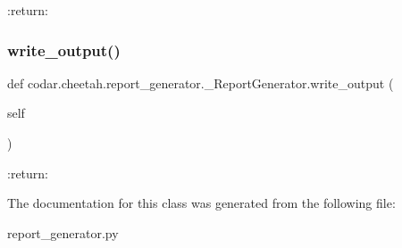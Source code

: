 \begin{DoxyVerb}:return:
\end{DoxyVerb}
 \mbox{\label{classcodar_1_1cheetah_1_1report__generator_1_1___report_generator_afa3df970816cabee4c9f898dd73db8ee}} 
\subsubsection{\texorpdfstring{write\+\_\+output()}{write\_output()}}
{\footnotesize\ttfamily def codar.\+cheetah.\+report\+\_\+generator.\+\_\+\+Report\+Generator.\+write\+\_\+output (\begin{DoxyParamCaption}\item[{}]{self }\end{DoxyParamCaption})}

\begin{DoxyVerb}:return:
\end{DoxyVerb}
 

The documentation for this class was generated from the following file\+:\begin{DoxyCompactItemize}
\item 
report\+\_\+generator.\+py\end{DoxyCompactItemize}
